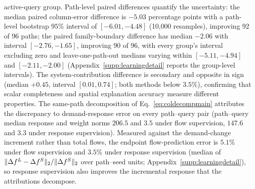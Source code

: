 active-query group. Path-level paired differences quantify the
uncertainty: the median paired column-error difference is $-5.03$
percentage points with a path-level bootstrap $95\%$ interval of
$[-6.01,-4.48]$ (10,000 resamples), improving 92 of 96 paths; the
paired family-boundary difference has median $-2.06$ with interval
$[-2.76,-1.65]$, improving 90 of 96, with every group's interval
excluding zero and leave-one-path-out medians varying within
$[-5.11,-4.94]$ and $[-2.11,-2.00]$
(Appendix~\ref{supp:learningdetail} reports the group-level intervals).
The system-contribution difference is secondary and opposite in sign
(median $+0.45$, interval $[0.01,0.74]$; both methods below $3.5\%$),
confirming that scalar completeness and spatial explanation accuracy
measure different properties. The same-path decomposition of
Eq.~\eqref{eq:coldecompmain} attributes the discrepancy to demand-response
error on every path--query pair (path--query median response and weight
norms $206.5$ and $3.5$ under flow supervision, $147.6$ and $3.3$ under
response supervision). Measured against the demand-change increment
rather than total flows, the endpoint flow-prediction error is
$5.1\%$ under flow supervision and $3.5\%$ under response supervision
(median of $\lVert \Delta f^L-\Delta f^S \rVert_2/\lVert \Delta f^S \rVert_2$ over
path--seed units; Appendix~\ref{supp:learningdetail}), so response
supervision also improves the incremental response that the
attributions decompose.

